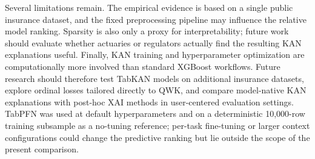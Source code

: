 \documentclass{article}
\begin{document}
Several limitations remain. The empirical evidence is based on a single public insurance dataset, and the fixed preprocessing pipeline may influence the relative model ranking. Sparsity is also only a proxy for interpretability; future work should evaluate whether actuaries or regulators actually find the resulting KAN explanations useful. Finally, KAN training and hyperparameter optimization are computationally more involved than standard XGBoost workflows. Future research should therefore test TabKAN models on additional insurance datasets, explore ordinal losses tailored directly to QWK, and compare model-native KAN explanations with post-hoc XAI methods in user-centered evaluation settings. TabPFN was used at default hyperparameters and on a deterministic 10{,}000-row training subsample as a no-tuning reference; per-task fine-tuning or larger context configurations could change the predictive ranking but lie outside the scope of the present comparison.



\end{document}
